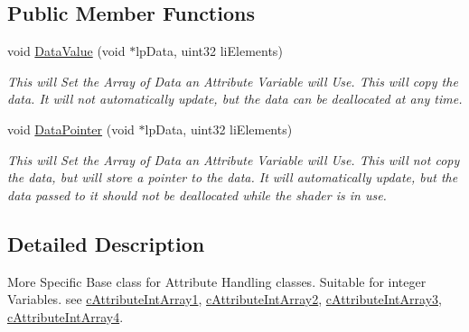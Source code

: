 \subsection*{Public Member Functions}
\begin{DoxyCompactItemize}
\item 
\hypertarget{classc_int_attribute_store_a259389363c8795340625fb46de6f1ab0}{
void \hyperlink{classc_int_attribute_store_a259389363c8795340625fb46de6f1ab0}{DataValue} (void $\ast$lpData, uint32 liElements)}
\label{classc_int_attribute_store_a259389363c8795340625fb46de6f1ab0}

\begin{DoxyCompactList}\small\item\em This will Set the Array of Data an Attribute Variable will Use. This will copy the data. It will not automatically update, but the data can be deallocated at any time. \end{DoxyCompactList}\item 
\hypertarget{classc_int_attribute_store_acc2f82fd0dbaab535be958132bf39c6e}{
void \hyperlink{classc_int_attribute_store_acc2f82fd0dbaab535be958132bf39c6e}{DataPointer} (void $\ast$lpData, uint32 liElements)}
\label{classc_int_attribute_store_acc2f82fd0dbaab535be958132bf39c6e}

\begin{DoxyCompactList}\small\item\em This will Set the Array of Data an Attribute Variable will Use. This will not copy the data, but will store a pointer to the data. It will automatically update, but the data passed to it should not be deallocated while the shader is in use. \end{DoxyCompactList}\end{DoxyCompactItemize}


\subsection{Detailed Description}
More Specific Base class for Attribute Handling classes. Suitable for integer Variables. see \hyperlink{classc_attribute_int_array1}{cAttributeIntArray1}, \hyperlink{classc_attribute_int_array2}{cAttributeIntArray2}, \hyperlink{classc_attribute_int_array3}{cAttributeIntArray3}, \hyperlink{classc_attribute_int_array4}{cAttributeIntArray4}. 
